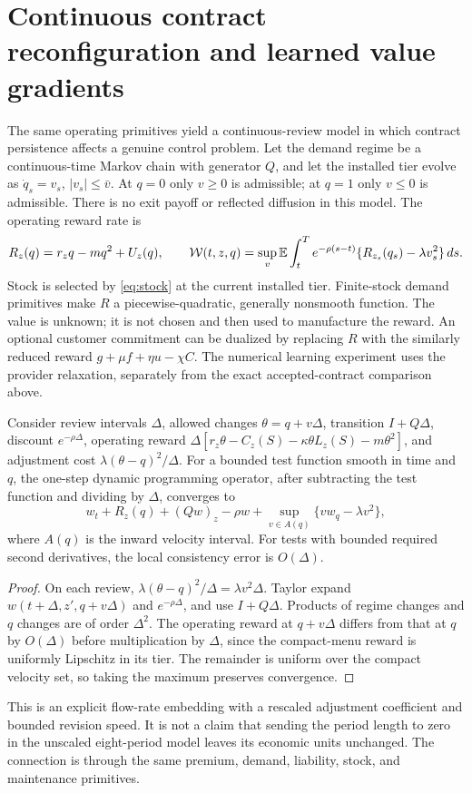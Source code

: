 \section{Continuous contract reconfiguration and learned value gradients}\label{sec:operationalcontinuous}
The same operating primitives yield a continuous-review model in which contract persistence affects a genuine control problem. Let the demand regime be a continuous-time Markov chain with generator $Q$, and let the installed tier evolve as $\dot q_s=v_s$, $|v_s|\leq\bar v$. At $q=0$ only $v\geq0$ is admissible; at $q=1$ only $v\leq0$ is admissible. There is no exit payoff or reflected diffusion in this model. The operating reward rate is
\[
 R_z(q)=r_zq-mq^2+U_z(q),
 \qquad \mathcal W(t,z,q)=\sup_v\mathbb E\int_t^T
 e^{-\rho(s-t)}\{R_{z_s}(q_s)-\lambda v_s^2\}\,ds.
\]
Stock is selected by \eqref{eq:stock} at the current installed tier. Finite-stock demand primitives make $R$ a piecewise-quadratic, generally nonsmooth function. The value is unknown; it is not chosen and then used to manufacture the reward. An optional customer commitment can be dualized by replacing $R$ with the similarly reduced reward $g+\mu f+\eta u-\chi C$. The numerical learning experiment uses the provider relaxation, separately from the exact accepted-contract comparison above.

\begin{proposition}\label{prop:embedding}
Consider review intervals $\Delta$, allowed changes $\theta=q+v\Delta$, transition $I+Q\Delta$, discount $e^{-\rho\Delta}$, operating reward $\Delta[r_z\theta-C_z(S)-\kappa\theta L_z(S)-m\theta^2]$, and adjustment cost $\lambda(\theta-q)^2/\Delta$. For a bounded test function smooth in time and $q$, the one-step dynamic programming operator, after subtracting the test function and dividing by $\Delta$, converges to
\begin{equation}\label{eq:operationalhjb}
 w_t+R_z(q)+(Qw)_z-\rho w+
 \sup_{v\in A(q)}\{v w_q-\lambda v^2\},
\end{equation}
where $A(q)$ is the inward velocity interval. For tests with bounded required second derivatives, the local consistency error is $O(\Delta)$.
\end{proposition}
\begin{proof}
On each review, $\lambda(\theta-q)^2/\Delta=\lambda v^2\Delta$. Taylor expand $w(t+\Delta,z',q+v\Delta)$ and $e^{-\rho\Delta}$, and use $I+Q\Delta$. Products of regime changes and $q$ changes are of order $\Delta^2$. The operating reward at $q+v\Delta$ differs from that at $q$ by $O(\Delta)$ before multiplication by $\Delta$, since the compact-menu reward is uniformly Lipschitz in its tier. The remainder is uniform over the compact velocity set, so taking the maximum preserves convergence.\end{proof}
This is an explicit flow-rate embedding with a rescaled adjustment coefficient and bounded revision speed. It is not a claim that sending the period length to zero in the unscaled eight-period model leaves its economic units unchanged. The connection is through the same premium, demand, liability, stock, and maintenance primitives.

